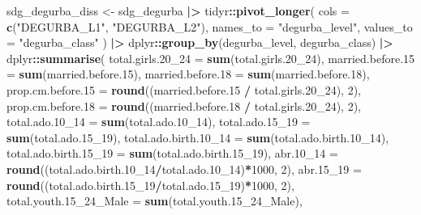 \documentclass[
]{article}
\newenvironment{Shaded}{\begin{snugshade}}{\end{snugshade}}
\newcommand{\AttributeTok}[1]{\textcolor[rgb]{0.13,0.29,0.53}{#1}}
\newcommand{\DecValTok}[1]{\textcolor[rgb]{0.00,0.00,0.81}{#1}}
\newcommand{\FloatTok}[1]{\textcolor[rgb]{0.00,0.00,0.81}{#1}}
\newcommand{\FunctionTok}[1]{\textcolor[rgb]{0.13,0.29,0.53}{\textbf{#1}}}
\newcommand{\NormalTok}[1]{#1}
\newcommand{\OtherTok}[1]{\textcolor[rgb]{0.56,0.35,0.01}{#1}}
\newcommand{\SpecialCharTok}[1]{\textcolor[rgb]{0.81,0.36,0.00}{\textbf{#1}}}
\newcommand{\StringTok}[1]{\textcolor[rgb]{0.31,0.60,0.02}{#1}}
\begin{document}
{\begin{Shaded}
\begin{Highlighting}[]
\NormalTok{sdg\_degurba\_diss }\OtherTok{\textless{}{-}} 
\NormalTok{  sdg\_degurba }\SpecialCharTok{|\textgreater{}}
\NormalTok{  tidyr}\SpecialCharTok{::}\FunctionTok{pivot\_longer}\NormalTok{(}
    \AttributeTok{cols =} \FunctionTok{c}\NormalTok{(}\StringTok{"DEGURBA\_L1"}\NormalTok{, }\StringTok{"DEGURBA\_L2"}\NormalTok{),}
    \AttributeTok{names\_to =} \StringTok{"degurba\_level"}\NormalTok{,}
    \AttributeTok{values\_to =} \StringTok{"degurba\_class"}
\NormalTok{  ) }\SpecialCharTok{|\textgreater{}}
\NormalTok{  dplyr}\SpecialCharTok{::}\FunctionTok{group\_by}\NormalTok{(degurba\_level, degurba\_class) }\SpecialCharTok{|\textgreater{}}
\NormalTok{  dplyr}\SpecialCharTok{::}\FunctionTok{summarise}\NormalTok{(}
    \AttributeTok{total.girls.20\_24 =} \FunctionTok{sum}\NormalTok{(total.girls}\FloatTok{.20}\NormalTok{\_24),}
    \AttributeTok{married.before.15   =} \FunctionTok{sum}\NormalTok{(married.before}\FloatTok{.15}\NormalTok{),}
    \AttributeTok{married.before.18 =} \FunctionTok{sum}\NormalTok{(married.before}\FloatTok{.18}\NormalTok{),}
    \AttributeTok{prop.cm.before.15   =} \FunctionTok{round}\NormalTok{((married.before}\FloatTok{.15} \SpecialCharTok{/}\NormalTok{ total.girls}\FloatTok{.20}\NormalTok{\_24), }\DecValTok{2}\NormalTok{),}
    \AttributeTok{prop.cm.before.18 =} \FunctionTok{round}\NormalTok{((married.before}\FloatTok{.18} \SpecialCharTok{/}\NormalTok{ total.girls}\FloatTok{.20}\NormalTok{\_24), }\DecValTok{2}\NormalTok{),}
    \AttributeTok{total.ado.10\_14 =} \FunctionTok{sum}\NormalTok{(total.ado}\FloatTok{.10}\NormalTok{\_14),}
    \AttributeTok{total.ado.15\_19 =} \FunctionTok{sum}\NormalTok{(total.ado}\FloatTok{.15}\NormalTok{\_19),}
    \AttributeTok{total.ado.birth.10\_14   =} \FunctionTok{sum}\NormalTok{(total.ado.birth}\FloatTok{.10}\NormalTok{\_14),}
    \AttributeTok{total.ado.birth.15\_19   =} \FunctionTok{sum}\NormalTok{(total.ado.birth}\FloatTok{.15}\NormalTok{\_19),}
    \AttributeTok{abr.10\_14   =} \FunctionTok{round}\NormalTok{((total.ado.birth}\FloatTok{.10}\NormalTok{\_14}\SpecialCharTok{/}\NormalTok{total.ado}\FloatTok{.10}\NormalTok{\_14)}\SpecialCharTok{*}\DecValTok{1000}\NormalTok{, }\DecValTok{2}\NormalTok{),}
    \AttributeTok{abr.15\_19   =} \FunctionTok{round}\NormalTok{((total.ado.birth}\FloatTok{.15}\NormalTok{\_19}\SpecialCharTok{/}\NormalTok{total.ado}\FloatTok{.15}\NormalTok{\_19)}\SpecialCharTok{*}\DecValTok{1000}\NormalTok{, }\DecValTok{2}\NormalTok{),}
    \AttributeTok{total.youth.15\_24\_Male =} \FunctionTok{sum}\NormalTok{(total.youth}\FloatTok{.15}\NormalTok{\_24\_Male),}

\end{Highlighting}
\end{Shaded}}
\end{document}

